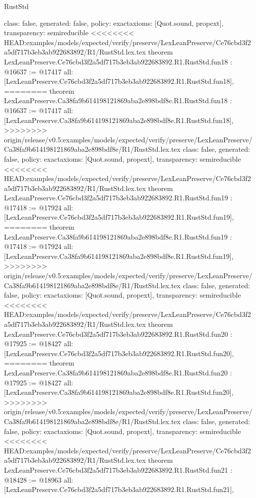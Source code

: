 \begin{lexlean}{RustStd}
\begin{coremodule}
{\begin{coremodule}
{{{{{{{{{{{{{{{{{{{{{  class: false,
  generated: false,
  policy: exact{axioms: [Quot.sound, propext]},
  transparency: semireducible
}
<<<<<<<< HEAD:examples/models/expected/verify/preserve/LexLeanPreserve/Ce76cbd3f2a5df717b3eb3ab922683892/R1/RustStd.lex.tex
theorem LexLeanPreserve.Ce76cbd3f2a5df717b3eb3ab922683892.R1.RustStd.fun18 : @16637 := @17417 {
  all: [LexLeanPreserve.Ce76cbd3f2a5df717b3eb3ab922683892.R1.RustStd.fun18],
========
theorem LexLeanPreserve.Ca38fa9b614198121869aba2e898bdf8e.R1.RustStd.fun18 : @16637 := @17417 {
  all: [LexLeanPreserve.Ca38fa9b614198121869aba2e898bdf8e.R1.RustStd.fun18],
>>>>>>>> origin/release/v0.5:examples/models/expected/verify/preserve/LexLeanPreserve/Ca38fa9b614198121869aba2e898bdf8e/R1/RustStd.lex.tex
  class: false,
  generated: false,
  policy: exact{axioms: [Quot.sound, propext]},
  transparency: semireducible
}
<<<<<<<< HEAD:examples/models/expected/verify/preserve/LexLeanPreserve/Ce76cbd3f2a5df717b3eb3ab922683892/R1/RustStd.lex.tex
theorem LexLeanPreserve.Ce76cbd3f2a5df717b3eb3ab922683892.R1.RustStd.fun19 : @17418 := @17924 {
  all: [LexLeanPreserve.Ce76cbd3f2a5df717b3eb3ab922683892.R1.RustStd.fun19],
========
theorem LexLeanPreserve.Ca38fa9b614198121869aba2e898bdf8e.R1.RustStd.fun19 : @17418 := @17924 {
  all: [LexLeanPreserve.Ca38fa9b614198121869aba2e898bdf8e.R1.RustStd.fun19],
>>>>>>>> origin/release/v0.5:examples/models/expected/verify/preserve/LexLeanPreserve/Ca38fa9b614198121869aba2e898bdf8e/R1/RustStd.lex.tex
  class: false,
  generated: false,
  policy: exact{axioms: [Quot.sound, propext]},
  transparency: semireducible
}
<<<<<<<< HEAD:examples/models/expected/verify/preserve/LexLeanPreserve/Ce76cbd3f2a5df717b3eb3ab922683892/R1/RustStd.lex.tex
theorem LexLeanPreserve.Ce76cbd3f2a5df717b3eb3ab922683892.R1.RustStd.fun20 : @17925 := @18427 {
  all: [LexLeanPreserve.Ce76cbd3f2a5df717b3eb3ab922683892.R1.RustStd.fun20],
========
theorem LexLeanPreserve.Ca38fa9b614198121869aba2e898bdf8e.R1.RustStd.fun20 : @17925 := @18427 {
  all: [LexLeanPreserve.Ca38fa9b614198121869aba2e898bdf8e.R1.RustStd.fun20],
>>>>>>>> origin/release/v0.5:examples/models/expected/verify/preserve/LexLeanPreserve/Ca38fa9b614198121869aba2e898bdf8e/R1/RustStd.lex.tex
  class: false,
  generated: false,
  policy: exact{axioms: [Quot.sound, propext]},
  transparency: semireducible
}
<<<<<<<< HEAD:examples/models/expected/verify/preserve/LexLeanPreserve/Ce76cbd3f2a5df717b3eb3ab922683892/R1/RustStd.lex.tex
theorem LexLeanPreserve.Ce76cbd3f2a5df717b3eb3ab922683892.R1.RustStd.fun21 : @18428 := @18963 {
  all: [LexLeanPreserve.Ce76cbd3f2a5df717b3eb3ab922683892.R1.RustStd.fun21],
}}}}}}}}}}}}}}}}}}}}}}}}
\end{coremodule}}
\end{coremodule}
\end{lexlean}
